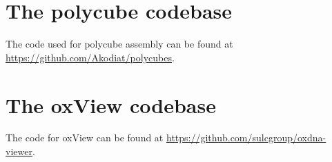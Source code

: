 

\chapter{The polycube codebase}

The code used for polycube assembly can be found at \url{https://github.com/Akodiat/polycubes}.

\minitoc

\chapter{The oxView codebase}

The code for oxView can be found at \url{https://github.com/sulcgroup/oxdna-viewer}.

\minitoc

